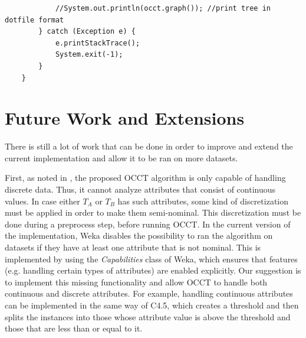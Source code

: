 \documentclass[a4paper,12pt]{article}
\begin{document}
\begin{spacing}{1.5}
\begin{lstlisting}
			//System.out.println(occt.graph()); //print tree in dotfile format
		} catch (Exception e) {
			e.printStackTrace();
			System.exit(-1);
		}
	}
\end{lstlisting}

\section{Future Work and Extensions}

There is still a lot of work that can be done in order to improve and extend the current implementation and allow it to be ran on more datasets.

First, as noted in \cite{dror2011thesis}, the proposed OCCT algorithm is only capable of handling discrete data. Thus, it cannot analyze attributes that consist of continuous values. In case either $T_A$ or $T_B$ has such attributes, some kind of discretization must be applied in order to make them semi-nominal. This discretization must be done during a preprocess step, before running OCCT. In the current version of the implementation, Weka disables the possibility to ran the algorithm on datasets if they have at least one attribute that is not nominal. This is implemented by using the {\em Capabilities} class of Weka, which ensures that features (e.g. handling certain types of attributes) are enabled explicitly. Our suggestion is to implement this missing functionality and allow OCCT to handle both continuous and discrete attributes. For example, handling continuous attributes can be implemented in the same way of C4.5, which creates a threshold and then splits the instances into those whose attribute value is above the threshold and those that are less than or equal to it.


\end{spacing}
\end{document}
